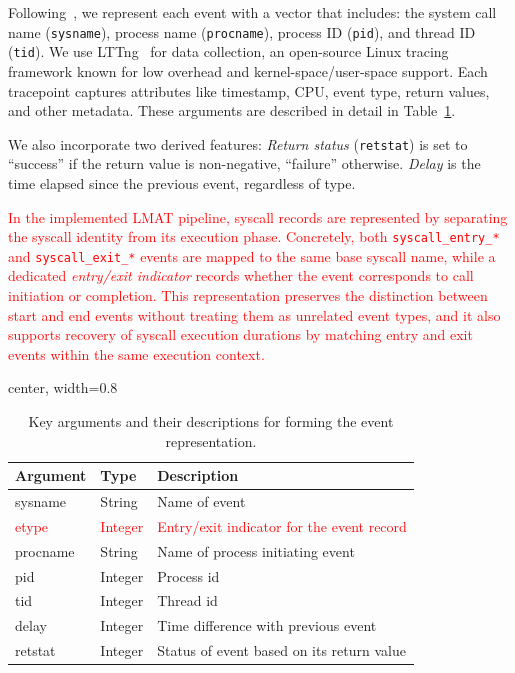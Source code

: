 \documentclass[preprint,12pt]{elsarticle}
\begin{document}
Following~\cite{fournier2021improving}, we represent each event with a vector that includes: the system call name (\texttt{sysname}), process name (\texttt{procname}), process ID (\texttt{pid}), and thread ID (\texttt{tid}). We use LTTng~\cite{lttng2024} for data collection, an open-source Linux tracing framework known for low overhead and kernel-space/user-space support. Each tracepoint captures attributes like timestamp, CPU, event type, return values, and other metadata. These arguments are described in detail in Table~\ref{tab:arguments}.

We also incorporate two derived features: \textit{Return status} (\texttt{retstat}) is set to “success” if the return value is non-negative, “failure” otherwise. \textit{Delay} is the time elapsed since the previous event, regardless of type.

\textcolor{red}{In the implemented LMAT pipeline, syscall records are represented by separating the syscall identity from its execution phase. Concretely, both \texttt{syscall\_entry\_*} and \texttt{syscall\_exit\_*} events are mapped to the same base syscall name, while a dedicated \textit{entry/exit indicator} records whether the event corresponds to call initiation or completion. This representation preserves the distinction between start and end events without treating them as unrelated event types, and it also supports recovery of syscall execution durations by matching entry and exit events within the same execution context.}


\begin{table}[tb]
\caption{Key arguments and their descriptions for forming the event representation.}
\label{tab:arguments}
\begin{adjustbox}{center, width=0.8\textwidth}
\begin{tabular}{lll}
\hline \hline
Argument & Type    & Description                                \\ \hline
sysname  & String  & Name of event                              \\
\textcolor{red}{etype} & \textcolor{red}{Integer} & \textcolor{red}{Entry/exit indicator for the event record} \\
procname & String  & Name of process initiating event           \\
pid      & Integer & Process id                                 \\
tid      & Integer & Thread id                                  \\
delay    & Integer & Time difference with previous event        \\
retstat  & Integer & Status of event based on its return value \\ \hline \hline
\end{tabular}
\end{adjustbox}
\end{table}
\end{document}

